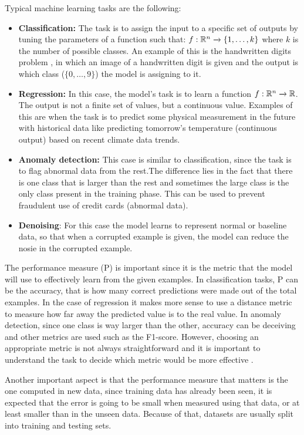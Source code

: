 Typical machine learning tasks are the following:
\begin{itemize}
    \item \textbf{Classification:} The task is to assign the input to a specific set of outputs by tuning the parameters of a function such that: $f: \mathbb{R}^n \xrightarrow{} \{1,\ldots, k\}$ where $k$ is the number of possible classes. An example of this is the handwritten digits problem \cite{MNIST}, in which an image of a handwritten digit is given and the output is which class ($\{0,\ldots,9\}$) the model is assigning to it. 
    \item \textbf{Regression:} In this case, the model's task is to learn a function $f: \mathbb{R}^n\xrightarrow{}\mathbb{R}$. The output is not a finite set of values, but a continuous value. Examples of this are when the task is to predict some physical measurement in the future with historical data like predicting tomorrow's temperature (continuous output) based on recent climate data trends.
    \item \textbf{Anomaly detection:} This case is similar to classification, since the task is to flag abnormal data from the rest.The difference lies in the fact that there is one class that is larger than the rest and sometimes the large class is the only class present in the training phase. This can be used to prevent fraudulent use of credit cards (abnormal data). 
    \item \textbf{Denoising}: For this case the model learns to represent normal or baseline data, so that when a corrupted example is given, the model can reduce the nosie in the corrupted example.
\end{itemize}

The performance measure (P) is important since it is the metric that the model will use to effectively learn from the given examples. In classification tasks, P can be the accuracy, that is how many correct predictions were made out of the total examples. In the case of regression it makes more sense to use a distance metric to measure how far away the predicted value is to the real value. In anomaly detection, since one class is way larger than the other, accuracy can be deceiving and other metrics are used such as the F1-score. However, choosing an appropriate metric is not always straightforward and it is important to understand the task to decide which metric would be more effective \cite{loss-survey}.

Another important aspect is that the performance measure that matters is the one computed in new data, since training data has already been seen, it is expected that the error is going to be small when measured using that data, or at least smaller than in the unseen data. Because of that, datasets are usually split into training and testing sets.

